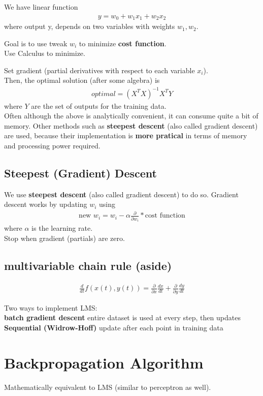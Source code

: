 \documentclass[12pt]{article}
\newcommand{\bt}[1]{\textbf{#1}} %
\newcommand{\eq}[1]{\begin{align*}#1\end{align*}} %
\renewcommand{\eq}[1]{\begin{align*}#1\end{align*}} %
\begin{document}
We have linear function
\eq{y = w_0 + w_1 x_1 + w_2x_2}
where output y, depends on two variables with weights $w_1, w_2$.

Goal is to use tweak $w_i$ to minimize \bt{cost function}.\\

Use Calculus to minimize. 

Set gradient (partial derivatives with respect to each variable $x_i$). \\
Then, the optimal solution (after some algebra) is 
\eq{optimal = (X^TX)^{-1} X^T Y}
where $Y$ are the set of outputs for the training data.\\

Often although the above is analytically convenient, it can consume quite a bit of memory. Other methods such as \bt{steepest descent} (also called gradient descent) are used, because their implementation is \bt{more pratical} in terms of memory and processing power required.

\subsection*{Steepest (Gradient) Descent}
We use \bt{steepest descent} (also called gradient descent) to do so.
Gradient descent works by updating $w_i$ using
\eq{\text{new } w_i = w_i - \alpha \frac{\partial}{\partial w_i} * \text{cost function}}
where $\alpha$ is the learning rate.\\

Stop when gradient (partials) are zero.
\subsection*{multivariable chain rule (aside)}

\eq{\frac{d}{dt} f(x(t), y(t)) = \frac{\partial}{\partial x} \frac{dx}{dt} + \frac{\partial}{\partial y} \frac{dy}{dt}}

Two ways to implement LMS: \\
\bt{batch gradient descent} entire dataset is used at every step, then updates \\
\bt{Sequential (Widrow-Hoff)} update after each point in training data 



\section*{Backpropagation Algorithm}

Mathematically equivalent to LMS (similar to perceptron as well).\\
\end{document}
